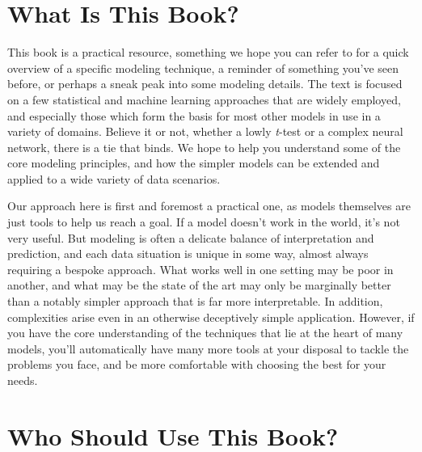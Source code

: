 \documentclass[
  letterpaper,
]{krantz}
\begin{document}
\section*{What Is This Book?}\label{what-is-this-book}


This book is a practical resource, something we hope you can refer to
for a quick overview of a specific modeling technique, a reminder of
something you've seen before, or perhaps a sneak peak into some modeling
details. The text is focused on a few statistical and machine learning
approaches that are widely employed, and especially those which form the
basis for most other models in use in a variety of domains. Believe it
or not, whether a lowly \emph{t}-test or a complex neural network, there
is a tie that binds. We hope to help you understand some of the core
modeling principles, and how the simpler models can be extended and
applied to a wide variety of data scenarios.

Our approach here is first and foremost a practical one, as models
themselves are just tools to help us reach a goal. If a model doesn't
work in the world, it's not very useful. But modeling is often a
delicate balance of interpretation and prediction, and each data
situation is unique in some way, almost always requiring a bespoke
approach. What works well in one setting may be poor in another, and
what may be the state of the art may only be marginally better than a
notably simpler approach that is far more interpretable. In addition,
complexities arise even in an otherwise deceptively simple application.
However, if you have the core understanding of the techniques that lie
at the heart of many models, you'll automatically have many more tools
at your disposal to tackle the problems you face, and be more
comfortable with choosing the best for your needs.

\section*{Who Should Use This Book?}\label{who-should-use-this-book}

\end{document}
